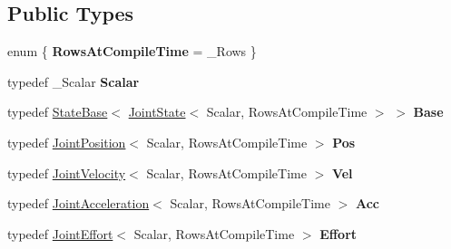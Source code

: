 \subsection*{Public Types}
\begin{DoxyCompactItemize}
\item 
enum \{ {\bfseries Rows\+At\+Compile\+Time} = \+\_\+\+Rows
 \}\hypertarget{classow__core_1_1JointState_adc859a7ae8cbdd12c8997fb357edd1df}{}\label{classow__core_1_1JointState_adc859a7ae8cbdd12c8997fb357edd1df}

\item 
typedef \+\_\+\+Scalar {\bfseries Scalar}\hypertarget{classow__core_1_1JointState_aa4aedc0d11f33346be0481efeea485c9}{}\label{classow__core_1_1JointState_aa4aedc0d11f33346be0481efeea485c9}

\item 
typedef \hyperlink{classow__core_1_1StateBase}{State\+Base}$<$ \hyperlink{classow__core_1_1JointState}{Joint\+State}$<$ Scalar, Rows\+At\+Compile\+Time $>$ $>$ {\bfseries Base}\hypertarget{classow__core_1_1JointState_a477f825075ab49eca0d8a0bcb60ebaf9}{}\label{classow__core_1_1JointState_a477f825075ab49eca0d8a0bcb60ebaf9}

\item 
typedef \hyperlink{classow__core_1_1JointPosition}{Joint\+Position}$<$ Scalar, Rows\+At\+Compile\+Time $>$ {\bfseries Pos}\hypertarget{classow__core_1_1JointState_af7a9d175cb042e76cc22e87b92a52be1}{}\label{classow__core_1_1JointState_af7a9d175cb042e76cc22e87b92a52be1}

\item 
typedef \hyperlink{classow__core_1_1JointVelocity}{Joint\+Velocity}$<$ Scalar, Rows\+At\+Compile\+Time $>$ {\bfseries Vel}\hypertarget{classow__core_1_1JointState_a3fa51f1714f7f6548a715e8c82b16e1a}{}\label{classow__core_1_1JointState_a3fa51f1714f7f6548a715e8c82b16e1a}

\item 
typedef \hyperlink{classow__core_1_1JointAcceleration}{Joint\+Acceleration}$<$ Scalar, Rows\+At\+Compile\+Time $>$ {\bfseries Acc}\hypertarget{classow__core_1_1JointState_a5c7df1f52e31b4ba68b3714d19410140}{}\label{classow__core_1_1JointState_a5c7df1f52e31b4ba68b3714d19410140}

\item 
typedef \hyperlink{classow__core_1_1JointEffort}{Joint\+Effort}$<$ Scalar, Rows\+At\+Compile\+Time $>$ {\bfseries Effort}\hypertarget{classow__core_1_1JointState_ab88a38b74f125f58345db1f6a056d186}{}\label{classow__core_1_1JointState_ab88a38b74f125f58345db1f6a056d186}

\end{DoxyCompactItemize}
